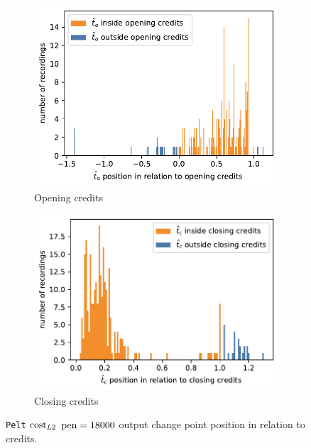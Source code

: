 \begin{figure}[h]
  \begin{subfigure}[t]{.49\textwidth}
    \centering
    \includegraphics[width=\linewidth]{../plots/distances/relative_opening_pelt.pdf}
    \caption{Opening credits}
    \label{fig:relative_opening}
  \end{subfigure}
  \hfill
  \begin{subfigure}[t]{.49\textwidth}
    \centering
    \includegraphics[width=\linewidth]{../plots/distances/relative_closing_pelt.pdf}
    \caption{Closing credits}
    \label{fig:relative_closing}
  \end{subfigure}
  \caption{\texttt{Pelt} $\operatorname{cost}_{L2}$ $\operatorname{pen}=18000$ output change point position in relation to credits.}
  \label{fig:relative}
\end{figure}


